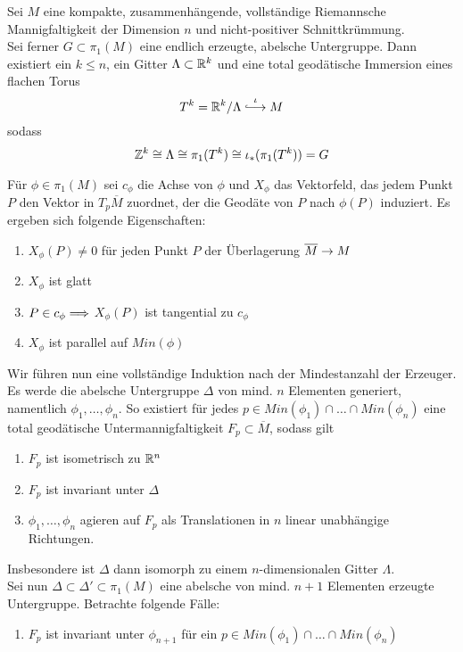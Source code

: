 \documentclass{book}
\renewcommand{\l}[1]{\overline{#1}}
\begin{document}
Sei $M$ eine kompakte, zusammenhängende, vollständige Riemannsche Mannigfaltigkeit der Dimension $n$ und nicht-positiver Schnittkrümmung.\\
Sei ferner $G \subset \pi_1(M)$ eine endlich erzeugte, abelsche Untergruppe. Dann existiert ein $k \leq n$, ein Gitter $\Lambda \subset \mathbb{R}^k$ und eine total geodätische Immersion eines flachen Torus
\[ T^k = \R^k/\Lambda \Inj{\iota} M \]
sodass
\[ \mathbb{Z}^k \overset{}{\cong} \Lambda \overset{}{\cong} \pi_1(T^k) \overset{}{\cong} \iota_*(\pi_1(T^k)) = G  \]
\begin{Beweis}{}
Für $\phi \in \pi_1(M)$ sei $c_\phi$ die Achse von $\phi$ und $X_\phi$ das Vektorfeld, das jedem Punkt $P$ den Vektor in $T_p\l M$ zuordnet, der die Geodäte von $P$ nach $\phi(P)$ induziert. Es ergeben sich folgende Eigenschaften:
\begin{enumerate}[1.)]
\item $X_\phi(P) \neq 0$ für jeden Punkt $P$ der Überlagerung $\l M \pfeil{} M$
\item $X_\phi$ ist glatt
\item $P\in c_\phi \overset{}{\Longrightarrow}$ $X_\phi(P)$ ist tangential zu $c_\phi$
\item $X_\phi$ ist parallel auf $Min(\phi)$
\end{enumerate}
Wir führen nun eine vollständige Induktion nach der Mindestanzahl der Erzeuger.\\
Es werde die abelsche Untergruppe $\Delta$ von mind. $n$ Elementen generiert, namentlich $\phi_1,\ldots,\phi_n$. So existiert für jedes $p \in Min(\phi_1)\cap \ldots\cap Min(\phi_n)$ eine total geodätische Untermannigfaltigkeit $F_p \subset \l M$, sodass gilt
\begin{enumerate}[(1)]
\item $F_p$ ist isometrisch zu $\mathbb{R}^n$
\item $F_p$ ist invariant unter $\Delta$
\item $\phi_1,\ldots, \phi_n$ agieren auf $F_p$ als Translationen in $n$ linear unabhängige Richtungen.
\end{enumerate}
Insbesondere ist $\Delta$ dann isomorph zu einem $n$-dimensionalen Gitter $\Lambda$.\\
Sei nun $\Delta \subset \Delta' \subset \pi_1(M)$ eine abelsche von mind. $n+1$ Elementen erzeugte Untergruppe. Betrachte folgende Fälle:
\begin{enumerate}
\item $F_p$ ist invariant unter $\phi_{n+1}$ für ein $p \in Min(\phi_1)\cap \ldots \cap Min(\phi_n)$\\

\end{enumerate}
\end{Beweis}
\end{document}
